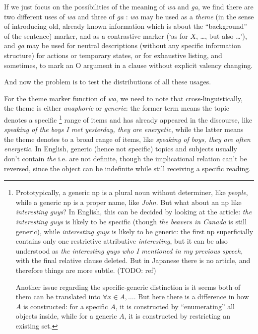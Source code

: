 \documentclass[UTF8, a4paper, oneside, scheme=plain]{ctexart}
\newcommand*{\citechap}[1]{chap.~{#1}}
\newcommand{\corpus}[1]{\emph{#1}}
\newcommand{\translate}[1]{`#1'}
\begin{document}
If we just focus on the possibilities of the meaning of \corpus{wa} and \corpus{ga},
we find there are two different uses of \corpus{wa} and three of \corpus{ga}
\citep[\citechap{2}]{kuno1973thestructure}:
\corpus{wa} may be used as a \emph{theme} 
(in the sense of introducing old, already known information which is about the ``background'' of the sentence)
marker, and as a contrastive marker 
(\translate{as for $X$, \dots, but also \dots}),
and \corpus{ga} may be used for neutral descriptions (without any specific information structure)
for actions or temporary states,
or for exhaustive listing,
and sometimes, to mark an O argument in a clause without explicit valency changing.

And now the problem is to test the distributions of all these usages.

For the theme marker function of \corpus{wa},
we need to note that cross-linguistically,
the theme is either \emph{anaphoric} or \emph{generic}:
the former term means the topic denotes a specific%
\footnote{
    Prototypically, a generic \ac{np} is a plural noun without determiner, 
    like \corpus{people},
    while a generic \ac{np} is a proper name, like \corpus{John}.
    But what about an \ac{np} like \corpus{interesting guys}?
    In English, this can be decided by looking at the article: 
    \corpus{the interesting guys} is likely to be specific
    (though \corpus{the beavers in Canada} is still generic),
    while \corpus{interesting guys} is likely to be generic:
    the first \ac{np} superficially contains only one restrictive attributive \corpus{interesting},
    but it can be also understood as \corpus{the interesting guys who I mentioned in my previous speech},
    with the final relative clause deleted.
    But in Japanese there is no article,
    and therefore things are more subtle. (TODO: ref)

    Another issue regarding the specific-generic distinction is 
    it seems both of them can be translated into $\forall x \in A, \ldots$.
    But here there is a difference in how $A$ is constructed:
    for a specific $A$, it is constructed by ``enumerating'' all objects inside,
    while for a generic $A$, it is constructed by restricting an existing set.
}
range of items
and has already appeared in the discourse,
like \corpus{speaking of the boys I met yesterday, they are energetic},
while the latter means the theme denotes to a broad range of items,
like \corpus{speaking of boys, they are often energetic}.
In English, generic (hence not specific) topics and subjects 
usually don't contain \corpus{the} i.e. are not definite,
though the implicational relation can't be reversed, 
since the object can be indefinite while still receiving a specific reading.
\end{document}
